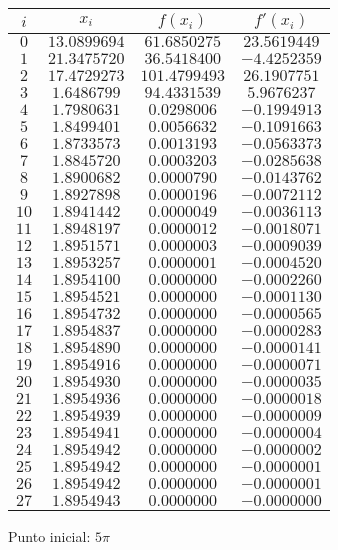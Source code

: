 \begin{figure}[H]
	\centering
	\caption{Punto inicial: $5\pi$ \converge}
	\begin{tabular}{|c|c|c|c|} \hline
		$i$ & $x_{i}$ & $f(x_{i})$ & $f'(x_{i})$ \\ \hline
		$0$ & $13.0899694$ & $61.6850275$ & $23.5619449$ \\ \hline
		$1$ & $21.3475720$ & $36.5418400$ & $-4.4252359$ \\ \hline
		$2$ & $17.4729273$ & $101.4799493$ & $26.1907751$ \\ \hline
		$3$ & $1.6486799$ & $94.4331539$ & $5.9676237$ \\ \hline
		$4$ & $1.7980631$ & $0.0298006$ & $-0.1994913$ \\ \hline
		$5$ & $1.8499401$ & $0.0056632$ & $-0.1091663$ \\ \hline
		$6$ & $1.8733573$ & $0.0013193$ & $-0.0563373$ \\ \hline
		$7$ & $1.8845720$ & $0.0003203$ & $-0.0285638$ \\ \hline
		$8$ & $1.8900682$ & $0.0000790$ & $-0.0143762$ \\ \hline
		$9$ & $1.8927898$ & $0.0000196$ & $-0.0072112$ \\ \hline
		$10$ & $1.8941442$ & $0.0000049$ & $-0.0036113$ \\ \hline
		$11$ & $1.8948197$ & $0.0000012$ & $-0.0018071$ \\ \hline
		$12$ & $1.8951571$ & $0.0000003$ & $-0.0009039$ \\ \hline
		$13$ & $1.8953257$ & $0.0000001$ & $-0.0004520$ \\ \hline
		$14$ & $1.8954100$ & $0.0000000$ & $-0.0002260$ \\ \hline
		$15$ & $1.8954521$ & $0.0000000$ & $-0.0001130$ \\ \hline
		$16$ & $1.8954732$ & $0.0000000$ & $-0.0000565$ \\ \hline
		$17$ & $1.8954837$ & $0.0000000$ & $-0.0000283$ \\ \hline
		$18$ & $1.8954890$ & $0.0000000$ & $-0.0000141$ \\ \hline
		$19$ & $1.8954916$ & $0.0000000$ & $-0.0000071$ \\ \hline
		$20$ & $1.8954930$ & $0.0000000$ & $-0.0000035$ \\ \hline
		$21$ & $1.8954936$ & $0.0000000$ & $-0.0000018$ \\ \hline
		$22$ & $1.8954939$ & $0.0000000$ & $-0.0000009$ \\ \hline
		$23$ & $1.8954941$ & $0.0000000$ & $-0.0000004$ \\ \hline
		$24$ & $1.8954942$ & $0.0000000$ & $-0.0000002$ \\ \hline
		$25$ & $1.8954942$ & $0.0000000$ & $-0.0000001$ \\ \hline
		$26$ & $1.8954942$ & $0.0000000$ & $-0.0000001$ \\ \hline
		$27$ & $1.8954943$ & $0.0000000$ & $-0.0000000$ \\ \hline
	\end{tabular}
\end{figure}


